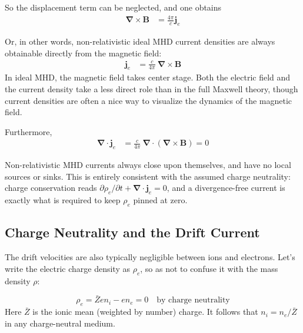 \documentclass[notoc]{tufte-handout}
\renewcommand{\vec}[1]{\mathbf{#1}}
\newcommand{\del}{\vec{\nabla}}
\newcommand{\B}{\vec{B}}
\begin{document}
So the displacement term can be neglected, and one obtains
\begin{align}
    \del \times \B & = \frac{4\pi}{c}\vec{j}_e
\end{align}

Or, in other words, non-relativistic ideal MHD current densities are always obtainable directly from the magnetic field:
\begin{align}
    \vec{j}_e &= \frac{c}{4\pi}~\del \times \B
\label{eqn:current}
\end{align}
%
In ideal MHD, the magnetic field takes center stage. Both the electric field and the current density take a less direct role than in the full Maxwell theory, though current densities are often a nice way to visualize the dynamics of the magnetic field.

Furthermore,
\begin{align}
    \del \cdot \vec{j}_e & = \frac{c}{4\pi}~\del \cdot \left(\del \times \B \right) = 0
\end{align}

Non-relativistic MHD currents always close upon themselves, and have no local sources or sinks. This is entirely consistent with the assumed charge neutrality: charge conservation reads $\partial \rho_e / \partial t + \del\cdot\vec{j}_e = 0$, and a divergence-free current is exactly what is required to keep $\rho_e$ pinned at zero.

\subsection{Charge Neutrality and the Drift Current}

The drift velocities are also typically negligible between ions and electrons. Let's write the electric charge density as $\rho_e$, so as not to confuse it with the mass density $\rho$:

\begin{equation}
\rho_e = \bar {Z} e n_i - en_e = 0 \quad \text{by charge neutrality}
\end{equation}
%
Here $\bar {Z}$ is the ionic mean (weighted by number) charge. It follows that $n_i = n_e / \bar {Z}$ in any charge-neutral medium.
\end{document}
